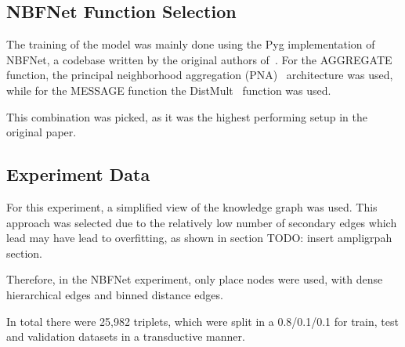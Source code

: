 \subsection{NBFNet Function Selection}

The training of the model was mainly done using the Pyg implementation of NBFNet, a codebase written by the original authors of~\cite{NBFNet_PyG}.
For the AGGREGATE function, the principal neighborhood aggregation (PNA)~\cite{PNA} architecture was used, while for the MESSAGE function the DistMult~\cite{DistMult} function
was used.

This combination was picked, as it was the highest performing setup in the original paper.

\subsection{Experiment Data}
For this experiment, a simplified view of the knowledge graph was used.
This approach was selected due to the relatively low number of secondary edges which lead may have lead to overfitting,
as shown in section TODO: insert ampligrpah section.

Therefore, in the NBFNet experiment, only place nodes were used, with dense hierarchical edges and binned distance
edges.

In total there were 25,982 triplets, which were split in a 0.8/0.1/0.1 for train, test and validation datasets
in a transductive manner.

